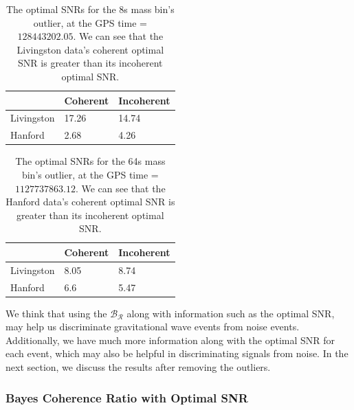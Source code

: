 \documentclass{article}
\begin{document}
 \begin{table}[]
 	\centering
 	\caption{The optimal SNRs for the 8s mass bin's outlier, at the GPS time = $128443202.05$. We can see that the Livingston data's coherent optimal SNR is greater than its incoherent optimal SNR.}
 	\label{table:8s}
 	\begin{tabular}{|l|ll|}
 		\hline
 		& \textbf{Coherent} & \textbf{Incoherent} \\ \hline
 		Livingston & 17.26             & 14.74               \\
 		Hanford    & 2.68              & 4.26                \\ \hline
 	\end{tabular}
 \end{table}
 
 \begin{table}[]
 	\centering
 	\caption{The optimal SNRs for the 64s mass bin's outlier, at the GPS time = $1127737863.12$. We can see that the Hanford data's coherent optimal SNR is greater than its incoherent optimal SNR.}
 	\label{table:64s}
 	\begin{tabular}{|l|ll|}
 		\hline
 		& \textbf{Coherent} & \textbf{Incoherent} \\ \hline
 		Livingston & 8.05              & 8.74                \\
 		Hanford    & 6.6               & 5.47                \\ \hline
 	\end{tabular}
 \end{table}
 
 
 We think that using the $\mathcal{B_{R}}$ along with information such as the optimal SNR, may help us discriminate gravitational wave events from noise events. Additionally, we have much more information along with the optimal SNR for each event, which may also be helpful in discriminating signals from noise. In the next section, we discuss the results after removing the outliers.

 
 
 \subsubsection{Bayes Coherence Ratio with Optimal SNR}
 
\end{document}
